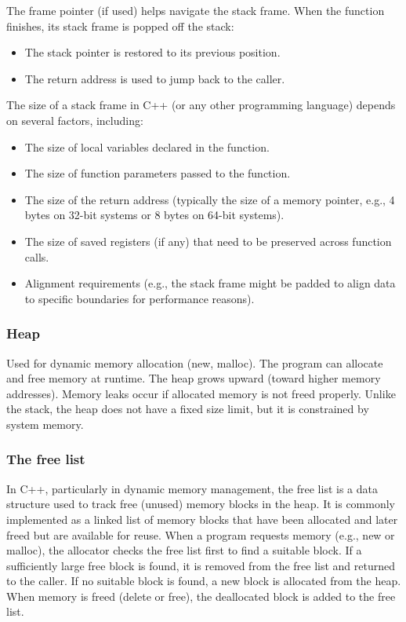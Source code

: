 \documentclass{report}
\begin{document}
\bigbreak \noindent 
The frame pointer (if used) helps navigate the stack frame.
\bigbreak \noindent 
When the function finishes, its stack frame is popped off the stack:
\begin{itemize}
    \item The stack pointer is restored to its previous position.
    \item The return address is used to jump back to the caller.
\end{itemize}
\bigbreak \noindent 
The size of a stack frame in C++ (or any other programming language) depends on several factors, including:
\begin{itemize}
    \item The size of local variables declared in the function.
    \item The size of function parameters passed to the function.
    \item The size of the return address (typically the size of a memory pointer, e.g., 4 bytes on 32-bit systems or 8 bytes on 64-bit systems).
    \item The size of saved registers (if any) that need to be preserved across function calls.
    \item Alignment requirements (e.g., the stack frame might be padded to align data to specific boundaries for performance reasons).
\end{itemize}


\bigbreak \noindent 
\subsubsection{Heap}
\bigbreak \noindent 
Used for dynamic memory allocation (new, malloc). The program can allocate and free memory at runtime.
\bigbreak \noindent 
The heap grows upward (toward higher memory addresses). Memory leaks occur if allocated memory is not freed properly.
\bigbreak \noindent 
Unlike the stack, the heap does not have a fixed size limit, but it is constrained by system memory.

\bigbreak \noindent 
\subsubsection{The free list}
\bigbreak \noindent 
In C++, particularly in dynamic memory management, the free list is a data structure used to track free (unused) memory blocks in the heap. It is commonly implemented as a linked list of memory blocks that have been allocated and later freed but are available for reuse.
\bigbreak \noindent 
When a program requests memory (e.g., new or malloc), the allocator checks the free list first to find a suitable block.
\bigbreak \noindent 
If a sufficiently large free block is found, it is removed from the free list and returned to the caller.
\bigbreak \noindent 
If no suitable block is found, a new block is allocated from the heap.
\bigbreak \noindent 
When memory is freed (delete or free), the deallocated block is added to the free list.
\end{document}
